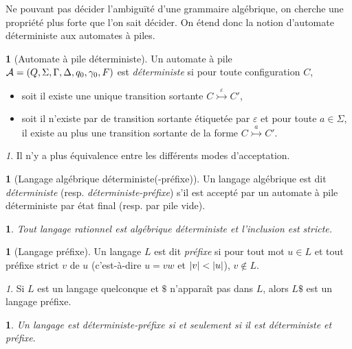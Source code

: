 \documentclass[11pt,a4paper]{article}
\theoremstyle{plain}
\theoremstyle{definition}
\newtheorem{defn}[thm]{\protect\definitionname}
\theoremstyle{definition}
\theoremstyle{remark}
\theoremstyle{remark}
\newtheorem{rem}[thm]{\protect\remarkname}
\theoremstyle{plain}
\theoremstyle{plain}
\newtheorem{prop}[thm]{\protect\propositionname}
\theoremstyle{plain}
\theoremstyle{remark}
\providecommand{\definitionname}{Définition}
\providecommand{\propositionname}{Proposition}
\providecommand{\remarkname}{Remarque}
\begin{document}
Ne pouvant pas décider l'ambiguïté d'une grammaire algébrique, on cherche une propriété plus forte que l'on sait décider. On étend donc la notion d'automate déterministe aux automates à piles.

\begin{defn}[Automate à pile déterministe]
	Un automate à pile \\$\mathcal{A}=(Q,\Sigma, \Gamma, \Delta, q_0, \gamma_0, F)$ est \emph{déterministe} si pour toute configuration $C$,
	\begin{itemize}
		\item soit il existe une unique transition sortante $C\overset{\varepsilon}{\rightarrowtail}C'$,
		\item soit il n'existe par de transition sortante étiquetée par $\varepsilon$ et pour toute $a\in \Sigma$, il existe au plus une transition sortante de la forme $C\overset{a}{\rightarrowtail}C'$.
	\end{itemize}
\end{defn}

\begin{rem}
	Il n'y a plus équivalence entre les différents modes d'acceptation.
\end{rem}

\begin{defn}[Langage algébrique déterministe(-préfixe)] %
	Un langage algébrique est dit \emph{déterministe} (resp. \emph{déterministe-préfixe}) s'il est accepté par un automate à pile déterministe par état final (resp. par pile vide).
\end{defn}

\begin{prop}
	Tout langage rationnel est algébrique déterministe et l'inclusion est stricte.
\end{prop}

\begin{defn}[Langage préfixe]
	Un langage $L$ est dit \emph{préfixe} si pour tout mot $u\in L$ et tout préfixe strict $v$ de $u$ (c'est-à-dire $u=vw$ et $\left|v\right| < \left|u\right|$), $v\not\in L$.
\end{defn}

\begin{rem}
	Si $L$ est un langage quelconque et $\$$ n'apparaît pas dans $L$, alors $L\$$ est un langage préfixe.
\end{rem}

\begin{prop} %
	Un langage est déterministe-préfixe si et seulement si il est déterministe et préfixe.
\end{prop}
\end{document}
